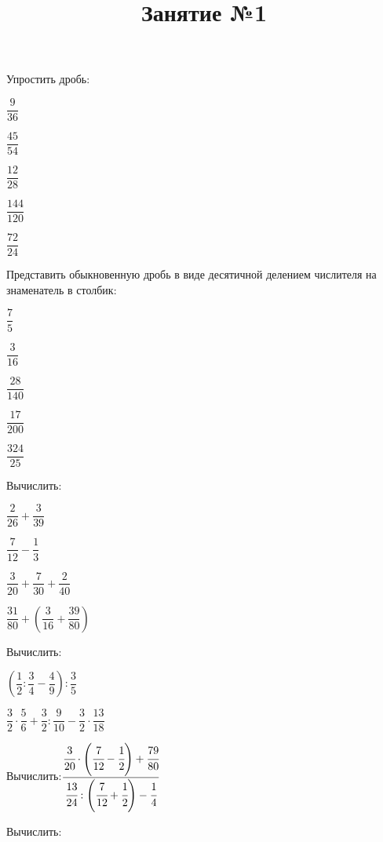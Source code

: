 \title{Занятие №1}
\begin{listofex}
	\item Упростить дробь:
	\begin{enumcols}[itemcolumns=5]
		\item \( \dfrac{9}{36} \)
		\item \( \dfrac{45}{54} \)
		\item \( \dfrac{12}{28} \)
		\item \( \dfrac{144}{120} \)
		\item \( \dfrac{72}{24} \)
	\end{enumcols}
	\item Представить обыкновенную дробь в виде десятичной делением числителя на знаменатель в столбик:
	\begin{enumcols}[itemcolumns=5]
		\item \( \dfrac{7}{5} \)
		\item \( \dfrac{3}{16} \)
		\item \( \dfrac{28}{140} \)
		\item \( \dfrac{17}{200} \)
		\item \( \dfrac{324}{25} \)
	\end{enumcols}
	\item Вычислить:
	\begin{enumcols}[itemcolumns=4]
		\item \( \dfrac{2}{26}+\dfrac{3}{39} \)
		\item \( \dfrac{7}{12}-\dfrac{1}{3} \)
		\item \( \dfrac{3}{20}+\dfrac{7}{30}+\dfrac{2}{40} \)
		\item \( \dfrac{31}{80}+\left( \dfrac{3}{16}+\dfrac{39}{80} \right) \)
	\end{enumcols}
	\item Вычислить:
	\begin{enumcols}[itemcolumns=2]
		\item \( \left( \dfrac{1}{2}:\dfrac{3}{4}-\dfrac{4}{9} \right):\dfrac{3}{5} \)
		\item \( \dfrac{3}{2}\cdot\dfrac{5}{6}+\dfrac{3}{2}:\dfrac{9}{10}-\dfrac{3}{2}\cdot\dfrac{13}{18} \)
	\end{enumcols}
	\item Вычислить:\qquad\( \dfrac{\cfrac{3}{20}\cdot\left( \cfrac{7}{12}-\cfrac{1}{2} \right)+\cfrac{79}{80}}{\cfrac{13}{24}:\left( \cfrac{7}{12}+\cfrac{1}{2} \right)-\cfrac{1}{4}} \)
	\item Вычислить:
	\begin{enumcols}[itemcolumns=3]

\end{enumcols}
\end{listofex}

